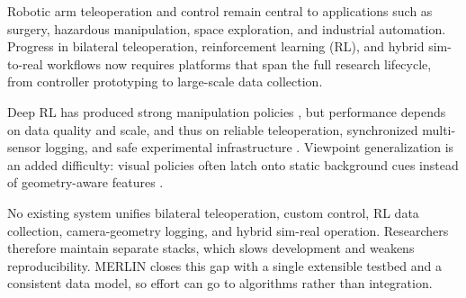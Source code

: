 \documentclass[a4paper, 10pt, conference]{ieeeconf}      %
\begin{document}
Robotic arm teleoperation and control remain central to applications such as surgery, hazardous manipulation, space exploration, and industrial automation. Progress in bilateral teleoperation, reinforcement learning (RL), and hybrid sim-to-real workflows now requires platforms that span the full research lifecycle, from controller prototyping to large-scale data collection.

Deep RL has produced strong manipulation policies \cite{han2023deeprl, singh2019endtoend}, but performance depends on data quality and scale, and thus on reliable teleoperation, synchronized multi-sensor logging, and safe experimental infrastructure \cite{mahmood2018senseact}. Viewpoint generalization is an added difficulty: visual policies often latch onto static background cues instead of geometry-aware features \cite{jiang2025kyknow}.

No existing system unifies bilateral teleoperation, custom control, RL data collection, camera-geometry logging, and hybrid sim-real operation. Researchers therefore maintain separate stacks, which slows development and weakens reproducibility. MERLIN closes this gap with a single extensible testbed and a consistent data model, so effort can go to algorithms rather than integration.


\end{document}
